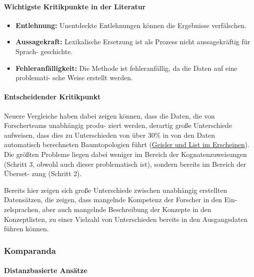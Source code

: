 \paragraph{Wichtigste Kritikpunkte in der Literatur}

\begin{itemize}
\itemsep1pt\parskip0pt
\item
  \textbf{Entlehnung:} Unentdeckte Entlehnungen können die Ergebnisse
  verfälschen.
\item
  \textbf{Aussagekraft:} Lexikalische Ersetzung ist als Prozess nicht
  aussagekräftig für Sprach- geschichte.
\item
  \textbf{Fehleranfälligkeit:} Die Methode ist fehleranfällig, da die
  Daten auf eine problemati- sche Weise erstellt werden.
\end{itemize}




\paragraph{Entscheidender Kritikpunkt}

Neuere Vergleiche haben dabei zeigen können, dass die Daten, die von
Forscherteams unabhängig produ- ziert werden, derartig große
Unterschiede aufweisen, dass dies zu Unterschieden von über 30\% in von
den Daten automatisch berechneten Baumtopologien führt
(\href{http://lingulist.de/jump.php?paper=Geisler2014\&href=documents/beautiful_trees.pdf}{Geisler
und List im Erscheinen}). Die größten Probleme liegen dabei weniger im
Bereich der Kognatenzuweisungen (Schritt 3, obwohl auch dieser
problematisch ist), sondern bereits im Bereich der Überset- zung
(Schritt 2).





Bereits hier zeigen sich große Unterschiede zwischen unabhängig
erstellten Datensätzen, die zeigen, dass mangelnde Kompetenz der
Forscher in den Ein- zelsprachen, aber auch mangelnde Beschreibung der
Konzepte in den Konzeptlisten, zu einer Vielzahl von Unterschieden
bereits in den Ausgangsdaten führen können.



\subsubsection{Komparanda}

\paragraph{Distanzbasierte Ansätze}

